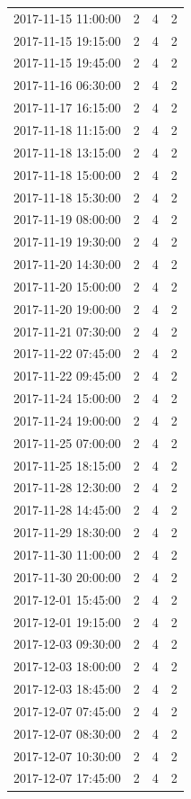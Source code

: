 \begin{tabular}{lrrr}
2017-11-15 11:00:00 & 2 & 4 & 2 \\
2017-11-15 19:15:00 & 2 & 4 & 2 \\
2017-11-15 19:45:00 & 2 & 4 & 2 \\
2017-11-16 06:30:00 & 2 & 4 & 2 \\
2017-11-17 16:15:00 & 2 & 4 & 2 \\
2017-11-18 11:15:00 & 2 & 4 & 2 \\
2017-11-18 13:15:00 & 2 & 4 & 2 \\
2017-11-18 15:00:00 & 2 & 4 & 2 \\
2017-11-18 15:30:00 & 2 & 4 & 2 \\
2017-11-19 08:00:00 & 2 & 4 & 2 \\
2017-11-19 19:30:00 & 2 & 4 & 2 \\
2017-11-20 14:30:00 & 2 & 4 & 2 \\
2017-11-20 15:00:00 & 2 & 4 & 2 \\
2017-11-20 19:00:00 & 2 & 4 & 2 \\
2017-11-21 07:30:00 & 2 & 4 & 2 \\
2017-11-22 07:45:00 & 2 & 4 & 2 \\
2017-11-22 09:45:00 & 2 & 4 & 2 \\
2017-11-24 15:00:00 & 2 & 4 & 2 \\
2017-11-24 19:00:00 & 2 & 4 & 2 \\
2017-11-25 07:00:00 & 2 & 4 & 2 \\
2017-11-25 18:15:00 & 2 & 4 & 2 \\
2017-11-28 12:30:00 & 2 & 4 & 2 \\
2017-11-28 14:45:00 & 2 & 4 & 2 \\
2017-11-29 18:30:00 & 2 & 4 & 2 \\
2017-11-30 11:00:00 & 2 & 4 & 2 \\
2017-11-30 20:00:00 & 2 & 4 & 2 \\
2017-12-01 15:45:00 & 2 & 4 & 2 \\
2017-12-01 19:15:00 & 2 & 4 & 2 \\
2017-12-03 09:30:00 & 2 & 4 & 2 \\
2017-12-03 18:00:00 & 2 & 4 & 2 \\
2017-12-03 18:45:00 & 2 & 4 & 2 \\
2017-12-07 07:45:00 & 2 & 4 & 2 \\
2017-12-07 08:30:00 & 2 & 4 & 2 \\
2017-12-07 10:30:00 & 2 & 4 & 2 \\
2017-12-07 17:45:00 & 2 & 4 & 2 \\

\end{tabular}
